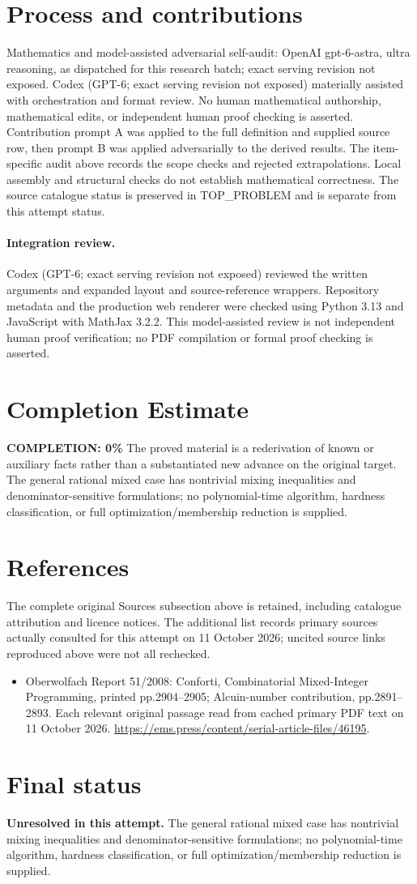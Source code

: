 \documentclass[11pt]{article}
\begin{document}
\section{Process and contributions}
Mathematics and model-assisted adversarial self-audit: OpenAI gpt-6-astra, ultra reasoning, as dispatched for this research batch; exact serving revision not exposed. Codex (GPT-6; exact serving revision not exposed) materially assisted with orchestration and format review. No human mathematical authorship, mathematical edits, or independent human proof checking is asserted.
Contribution prompt A was applied to the full definition and supplied source row, then prompt B was applied adversarially to the derived results. The item-specific audit above records the scope checks and rejected extrapolations. Local assembly and structural checks do not establish mathematical correctness. The source catalogue status is preserved in TOP\_PROBLEM and is separate from this attempt status.
\paragraph{Integration review.} Codex (GPT-6; exact serving revision not exposed) reviewed the written arguments and expanded layout and source-reference wrappers. Repository metadata and the production web renderer were checked using Python 3.13 and JavaScript with MathJax 3.2.2. This model-assisted review is not independent human proof verification; no PDF compilation or formal proof checking is asserted.

\section{Completion Estimate}
\noindent\textbf{COMPLETION: 0\%}
The proved material is a rederivation of known or auxiliary facts rather than a substantiated new advance on the original target. The general rational mixed case has nontrivial mixing inequalities and denominator-sensitive formulations; no polynomial-time algorithm, hardness classification, or full optimization/membership reduction is supplied.
\section{References}
The complete original Sources subsection above is retained, including catalogue attribution and licence notices. The additional list records primary sources actually consulted for this attempt on 11 October 2026; uncited source links reproduced above were not all rechecked.
\begin{itemize}
\item Oberwolfach Report 51/2008: Conforti, Combinatorial Mixed-Integer Programming, printed pp.2904--2905; Alcuin-number contribution, pp.2891--2893. Each relevant original passage read from cached primary PDF text on 11 October 2026. \url{https://ems.press/content/serial-article-files/46195}.
\end{itemize}
\section{Final status}
\textbf{Unresolved in this attempt.} The general rational mixed case has nontrivial mixing inequalities and denominator-sensitive formulations; no polynomial-time algorithm, hardness classification, or full optimization/membership reduction is supplied.
\end{document}
